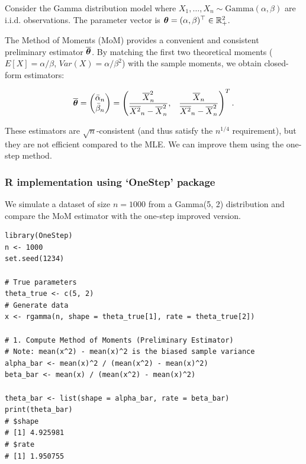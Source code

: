 \begin{ex}
    
\label{sub:Gamma_OneStep}

Consider the Gamma distribution model where $X_1, \ldots, X_n \sim \text{Gamma}(\alpha, \beta)$ are i.i.d. observations. The parameter vector is $\boldsymbol{\theta} = (\alpha, \beta)^{\top} \in \mathbb{R}^2_+$.

The Method of Moments (MoM) provides a convenient and consistent preliminary estimator $\overline{\boldsymbol{\theta}}$. By matching the first two theoretical moments ($E[X] = \alpha/\beta$, $Var(X) = \alpha/\beta^2$) with the sample moments, we obtain closed-form estimators:

\[
    \overline{\boldsymbol{\theta}} = \begin{pmatrix} \bar{\alpha}_n \\ \bar{\beta}_n \end{pmatrix} = \begin{pmatrix} \dfrac{\overline{X}_n^2}{\overline{X^2}_n - \overline{X}_n^2}, & \dfrac{\overline{X}_n}{\overline{X^2}_n - \overline{X}_n^2} \end{pmatrix}^{T}.
\]

These estimators are $\sqrt{n}$-consistent (and thus satisfy the $n^{1/4}$ requirement), but they are not efficient compared to the MLE. We can improve them using the one-step method.

\subsubsection{R implementation using `OneStep' package}
We simulate a dataset of size $n=1000$ from a Gamma(5, 2) distribution and compare the MoM estimator with the one-step improved version.

\begin{verbatim}
library(OneStep)
n <- 1000
set.seed(1234)

# True parameters
theta_true <- c(5, 2)
# Generate data
x <- rgamma(n, shape = theta_true[1], rate = theta_true[2])

# 1. Compute Method of Moments (Preliminary Estimator)
# Note: mean(x^2) - mean(x)^2 is the biased sample variance
alpha_bar <- mean(x)^2 / (mean(x^2) - mean(x)^2)
beta_bar <- mean(x) / (mean(x^2) - mean(x)^2)

theta_bar <- list(shape = alpha_bar, rate = beta_bar)
print(theta_bar)
# $shape
# [1] 4.925981
# $rate
# [1] 1.950755
\end{verbatim}


\end{ex}
